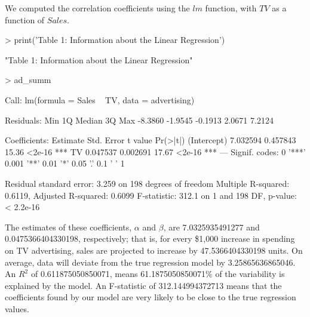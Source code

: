 \documentclass{report}
\begin{document}
\begin{results}
We computed the correlation coefficients using the $lm$ function, with $TV$ as a function of $Sales$.

\begin{Schunk}
\begin{Sinput}
> print('Table 1: Information about the Linear Regression')
\end{Sinput}
\begin{Soutput}
[1] "Table 1: Information about the Linear Regression"
\end{Soutput}
\begin{Sinput}
> ad_summ
\end{Sinput}
\begin{Soutput}
Call:
lm(formula = Sales ~ TV, data = advertising)

Residuals:
    Min      1Q  Median      3Q     Max 
-8.3860 -1.9545 -0.1913  2.0671  7.2124 

Coefficients:
            Estimate Std. Error t value Pr(>|t|)    
(Intercept) 7.032594   0.457843   15.36   <2e-16 ***
TV          0.047537   0.002691   17.67   <2e-16 ***
---
Signif. codes:  0 '***' 0.001 '**' 0.01 '*' 0.05 '.' 0.1 ' ' 1

Residual standard error: 3.259 on 198 degrees of freedom
Multiple R-squared:  0.6119,	Adjusted R-squared:  0.6099 
F-statistic: 312.1 on 1 and 198 DF,  p-value: < 2.2e-16
\end{Soutput}
\end{Schunk}

The estimates of these coefficients, $\alpha$ and $\beta$, are 7.0325935491277 and 0.0475366404330198, respectively; that is, for every \$1,000 increase in spending on TV advertising, sales are projected to increase by 47.5366404330198 units. On average, data will deviate from the true regression model by 3.25865636865046. An $R^2$ of 0.611875050850071, means 61.1875050850071\% of the variability is explained by the model. An F-statistic of 312.144994372713 means that the coefficients found by our model are very likely to be close to the true regression values.

\end{results}

\end{document}
